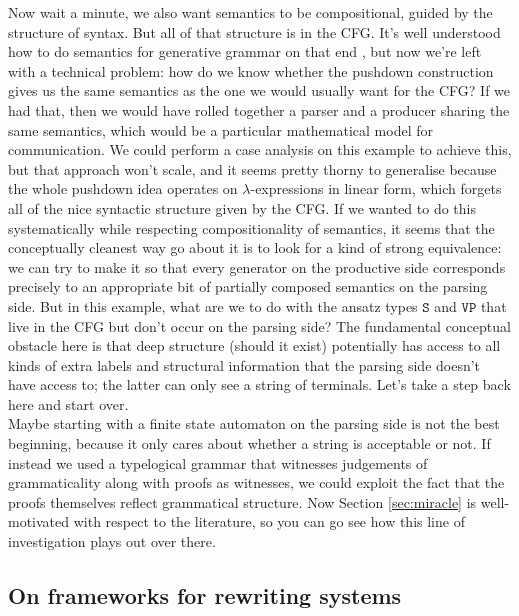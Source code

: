 Now wait a minute, we also want semantics to be compositional, guided by the structure of syntax. But all of that structure is in the CFG. It's well understood how to do semantics for generative grammar on that end \citep{heimSemanticsGenerativeGrammar1998b}, but now we're left with a technical problem: how do we know whether the pushdown construction gives us the same semantics as the one we would usually want for the CFG? If we had that, then we would have rolled together a parser and a producer sharing the same semantics, which would be a particular mathematical model for communication. We could perform a case analysis on this example to achieve this, but that approach won't scale, and it seems pretty thorny to generalise because the whole pushdown idea operates on $\lambda$-expressions in linear form, which forgets all of the nice syntactic structure given by the CFG. If we wanted to do this systematically while respecting compositionality of semantics, it seems that the conceptually cleanest way go about it is to look for a kind of strong equivalence: we can try to make it so that every generator on the productive side corresponds precisely to an appropriate bit of partially composed semantics on the parsing side. But in this example, what are we to do with the ansatz types $\texttt{S}$ and $\texttt{VP}$ that live in the CFG but don't occur on the parsing side? The fundamental conceptual obstacle here is that deep structure (should it exist) potentially has access to all kinds of extra labels and structural information that the parsing side doesn't have access to; the latter can only see a string of terminals. Let's take a step back here and start over.\\

Maybe starting with a finite state automaton on the parsing side is not the best beginning, because it only cares about whether a string is acceptable or not. If instead we used a typelogical grammar that witnesses judgements of grammaticality along with proofs as witnesses, we could exploit the fact that the proofs themselves reflect grammatical structure. Now Section \ref{sec:miracle} is well-motivated with respect to the literature, so you can go see how this line of investigation plays out over there.

\subsection{On frameworks for rewriting systems}

